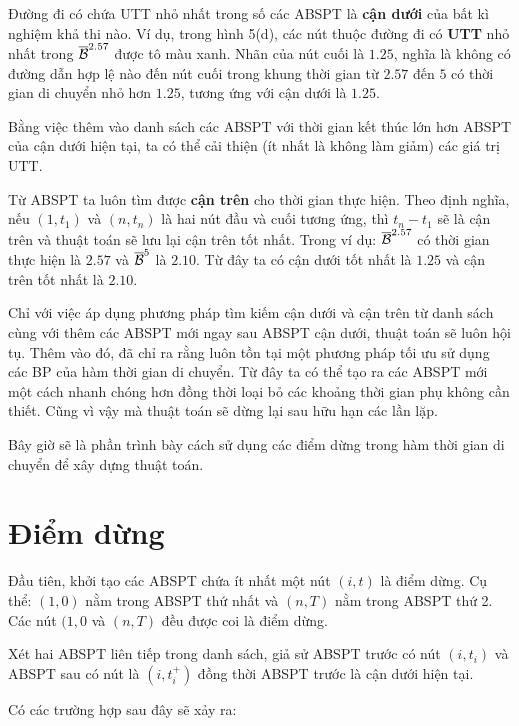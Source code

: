 \documentclass[../main.tex]{subfiles}
\begin{document}
Đường đi có chứa UTT nhỏ nhất trong số các ABSPT là \textbf{cận dưới}
của bất kì nghiệm khả thi nào. Ví dụ, trong hình 5(d), các nút thuộc
đường đi có \textbf{UTT} nhỏ nhất trong \(\overline{\cal B}^{2.57}\)
được tô màu xanh. Nhãn của nút cuối là \(1.25\), nghĩa là không có đường
dẫn hợp lệ nào đến nút cuối trong khung thời gian từ \(2.57\) đến \(5\)
có thời gian di chuyển nhỏ hơn \(1.25\), tương ứng với cận dưới là
\(1.25\).

Bằng việc thêm vào danh sách các ABSPT với thời gian kết thúc lớn hơn
ABSPT của cận dưới hiện tại, ta có thể cải thiện (ít nhất là không làm
giảm) các giá trị UTT.

Từ ABSPT ta luôn tìm được \textbf{cận trên} cho thời gian thực hiện.
Theo định nghĩa, nếu \((1, t_1)\) và \((n, t_n)\) là hai nút đầu và cuối
tương ứng, thì \(t_n - t_1\) sẽ là cận trên và thuật toán sẽ lưu lại cận
trên tốt nhất. Trong ví dụ: \(\overline{\cal B}^{2.57}\) có thời gian
thực hiện là \(2.57\) và \(\overline{\cal B}^{5}\) là \(2.10\). Từ đây
ta có cận dưới tốt nhất là \(1.25\) và cận trên tốt nhất là \(2.10\).

Chỉ với việc áp dụng phương pháp tìm kiếm cận dưới và cận trên từ danh
sách cùng với thêm các ABSPT mới ngay sau ABSPT cận dưới, thuật toán sẽ luôn hội tụ. 
Thêm vào đó, \cite{foschini2011complexity} đã chỉ ra rằng luôn tồn tại một phương pháp tối ưu sử dụng
các BP của hàm thời gian di chuyển. Từ đây ta có thể
tạo ra các ABSPT mới một cách nhanh chóng hơn
đồng thời loại bỏ các khoảng thời gian phụ không cần thiết. Cũng vì vậy
mà thuật toán sẽ dừng lại sau hữu hạn các lần lặp.

Bây giờ sẽ là phần trình bày cách sử dụng các điểm dừng trong hàm thời
gian di chuyển để xây dựng thuật toán.

\section{Điểm dừng}\label{ux111iux1ec3m-dux1eebng}

Đầu tiên, khởi tạo các ABSPT chứa ít nhất một nút \((i, t)\) là điểm
dừng. Cụ thể: \((1, 0)\) nằm trong ABSPT thứ nhất và \((n, T)\) nằm
trong ABSPT thứ 2. Các nút \((1, 0\) và \((n, T)\) đều được coi là điểm
dừng.

Xét hai ABSPT liên tiếp trong danh sách, giả sử ABSPT trước có nút
\((i, t_i)\) và ABSPT sau có nút là \((i, t_i^+)\) đồng thời ABSPT trước
là cận dưới hiện tại.

Có các trường hợp sau đây sẽ xảy ra:
\end{document}

